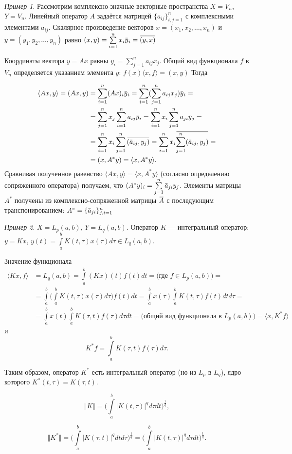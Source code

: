 \documentclass[12pt,a4paper,titlepage,oneside]{book}
\newcommand{\overbar}[1]{\mkern 1.5mu\overline{\mkern-1.5mu#1\mkern-1.5mu}\mkern 1.5mu}
\theoremstyle{definition}
\theoremstyle{plain}
\theoremstyle{break}
\theoremstyle{remark}
\theoremstyle{remark}
\newtheorem*{example}{Пример}
\theoremstyle{remark}
\theoremstyle{remark}
\theoremstyle{plain}
\theoremstyle{plain}
\begin{document}
\begin{example}
Рассмотрим комплексно-значные векторные пространства $X=V_n$, $Y=V_n$. Линейный оператор $A$ задаётся матрицей $\lbrace a_{ij} \rbrace_{i,j=1}^n$ с комплексными элементами $a_{ij}$. Скалярное произведение векторов $x = (x_1,x_2,\ldots,x_n)$ и $y = (y_1,y_2,\ldots,y_n)$ равно $(x,y) = \sum\limits_{i=1}^n x_i \overbar{y}_i = \overbar{(y,x)}$

Координаты вектора $y=Ax$ равны $y_i = \sum\limits_{j=1}^n a_{ij} x_j$. Общий вид функционала $f$ в $V_n$ определяется указанием элемента $y$:
$f(x) \langle x,f \rangle = (x,y)$
Тогда

\begin{align*}
\langle Ax,y \rangle = (Ax,y) &= \sum\limits_{i=1}^n (Ax)_i \overbar{y}_i = \sum\limits_{i=1}^n (\sum\limits_{j=1}^n a_{ij}x_j)\overbar{y}_i =\\
&= \sum\limits_{j=1}^n x_j \sum\limits_{i=1}^n a_{ij}\overbar{y}_i = \sum\limits_{i=1}^n x_i \sum\limits_{j=1}^n a_{ji}\overbar{y}_j =\\
&= \sum\limits_{i=1}^n x_i \sum\limits_{j=1}^n \overbar{(\overbar{a}_{ij},y_j)} = \sum\limits_{i=1}^n x_i \overbar{\sum\limits_{j=1}^n(\overbar{a}_{ij} ,y_j)} =\\
&= (x,A^{*}y)=\langle x, A^{*}y \rangle.
\end{align*} 
Сравнивая полученное равенство $\langle Ax,y \rangle = \langle x, A^{*}y \rangle$ (согласно определению сопряженного оператора) получаем, что
$(A^{*}y)_i = \sum\limits_{j=1}^n \overbar{a}_{ji} y_j$.
Элементы матрицы $A^{*}$ получены из комплексно-сопряженной матрицы $\overbar{A}$ с последующим транспонированием: $A^{*}=\{\overbar{a}_{ji}\}_{j,i=1}^n$
\end{example}

\begin{example}
$X=L_p(a,b)$, $Y=L_q(a,b)$. Оператор $K$ --- интегральный оператор: $y=Kx$, $y(t)=\displaystyle\int\limits_a^b K(t,\tau)x(\tau)d\tau \in L_q(a,b)$.

Значение функционала
\begin{align*}
\langle Kx,f \rangle &= L_q(a,b)=\int\limits_a^b (Kx)(t)f(t)dt = \mbox{(где $f \in L_p(a,b)$)} = \\
&= \int\limits_a^b \Big( \int\limits_a^b K(t,\tau)x(\tau)d\tau \Big) f(t)dt = \int\limits_a^b x(\tau) \int\limits_a^b K(t,\tau)f(t)dt d\tau =\\
&= \int\limits_a^b x(t) \int\limits_a^b K(\tau,t)f(\tau)d\tau dt = \mbox{(общий вид функционала в $L_p(a,b)$)} = \langle x,K^{*}f \rangle
\end{align*}
и
$$K^{*}f=\int\limits_a^b K(\tau, t)f(\tau)d\tau.$$

Таким образом, оператор $K^{*}$ есть интегральный оператор (но из $L_p$ в $L_q$), ядро которого $K^{*}(t,\tau)=K(\tau,t)$.

$$\Vert K \Vert = \Big( \displaystyle\int\limits_a^b \lvert K(t,\tau) \rvert^q d\tau dt  \Big)^{\frac{1}{q}},$$

$$\Vert K^{*} \Vert =  \Big( \displaystyle\int\limits_a^b \lvert K(\tau, t) \rvert^q dt d\tau  \Big)^{\frac{1}{q}} =  \Big( \displaystyle\int\limits_a^b \lvert K(t,\tau) \rvert^q d\tau dt  \Big)^{\frac{1}{q}}.$$
\end{example}
\end{document}
